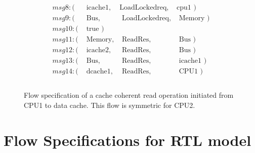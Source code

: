 \documentclass[12pt,frontmatter,copyright,thesis]{usfmanus}
\begin{document}
\begin{appendix}
\begin{figure}[h]
\begin{minipage}{.5\textwidth}
 {\footnotesize
 \[
 \begin{array}{llll}
 msg8: (&\mbox{ icache1},&\mbox{LoadLockedreq},&\mbox{cpu1       })\\
 msg9: (&\mbox{ Bus},&\mbox{ LoadLockedreq},&\mbox{ Memory     })\\
 msg10: (&\mbox{ true })\\
 msg11: (&\mbox{ Memory},&\mbox{ ReadRes},&\mbox{ Bus       })\\     
 msg12: (&\mbox{ icache2},&\mbox{ ReadRes},&\mbox{ Bus    })\\
 msg13: (&\mbox{ Bus},&\mbox{ ReadRes},&\mbox{ icache1 })\\
 msg14: (&\mbox{ dcache1},&\mbox{ ReadRes},&\mbox{ CPU1 })\\\\
 \end{array}
 \]}
 \end{minipage}
 
 \caption{\footnotesize Flow specification of a cache coherent read operation initiated from CPU1 to  data cache. \footnotesize This flow is symmetric for CPU2. }
 \label{read-dcache} 
 \end{figure}
 \clearpage
 




\chapter{Flow Specifications for RTL model}%

\end{appendix}
\end{document}
